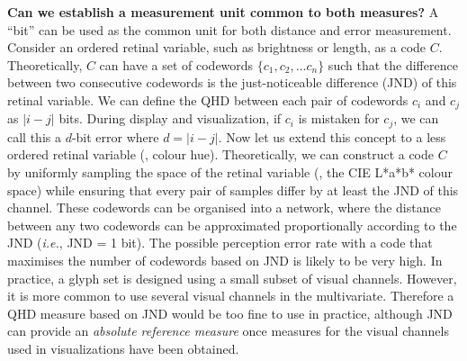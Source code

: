 \noindent\textbf{Can we establish a measurement unit common to both measures?} A ``bit'' can be used as the common unit for both distance and error measurement.
Consider an ordered retinal variable, such as brightness or length, as a code $C$.
Theoretically, $C$ can have a set of codewords $\{ c_1, c_2, \ldots c_n \}$ such that the difference between two consecutive codewords is the just-noticeable difference (JND) of this retinal variable.
We can define the QHD between each pair of codewords $c_i$ and $c_j$ as $|i-j|$ bits.
During display and visualization, if $c_i$ is mistaken for $c_j$, we can call this a $d$-bit error where $d=|i-j|$.
Now let us extend this concept to a less ordered retinal variable (\eg, colour hue).
Theoretically, we can construct a code $C$ by uniformly sampling the space of the retinal variable (\eg, the CIE L*a*b* colour space) while ensuring that every pair of samples differ by at least the JND of this channel.
These codewords can be organised into a network, where the distance between any two codewords can be approximated proportionally according to the JND (\emph{i.e.}, JND = 1 bit).
The possible perception error rate with a code that maximises the number of codewords based on JND is likely to be very high.
In practice, a glyph set is designed using a small subset of visual channels.
However, it is more common to use several visual channels in the multivariate.
Therefore a QHD measure based on JND would be too fine to use in practice, although JND can provide an \emph{absolute reference measure} once measures for the visual channels used in visualizations have been obtained.\\

